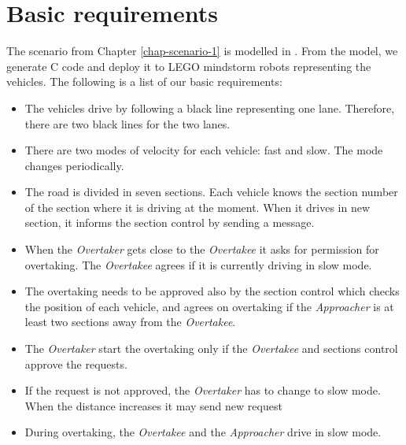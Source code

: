 \chapter{Basic requirements}
\label{chap-basic-2}

The scenario from Chapter \ref{chap-scenario-1} is modelled in \muml. From the model, we generate C code and deploy it to LEGO mindstorm robots representing the vehicles. The following is a list of our basic requirements:

\begin{itemize}

\item The vehicles drive by following a black line representing one lane. Therefore, there are two black lines for the two lanes.
\item There are two modes of velocity for each vehicle: fast and slow. The mode changes periodically. 
\item The road is divided in seven sections. Each vehicle knows the section number of the section where it is driving at the moment. When it drives in new section, it informs the section control by sending a message.  
\item When the \textit{Overtaker} gets close to the \textit{Overtakee} it asks for permission for overtaking. The \textit{Overtakee} agrees if it is currently driving in slow mode.
\item The overtaking needs to be approved also by the section control which checks the position of each vehicle, and agrees on overtaking if the \textit{Approacher} is at least two sections away from the \textit{Overtakee}.   
\item The \textit{Overtaker} start the overtaking only if the \textit{Overtakee} and sections control approve the requests. 
\item If the request is not approved, the \textit{Overtaker} has to change to slow mode. When the distance increases it may send new request
\item During overtaking, the \textit{Overtakee} and the \textit{Approacher} drive in slow mode. 

\end{itemize}